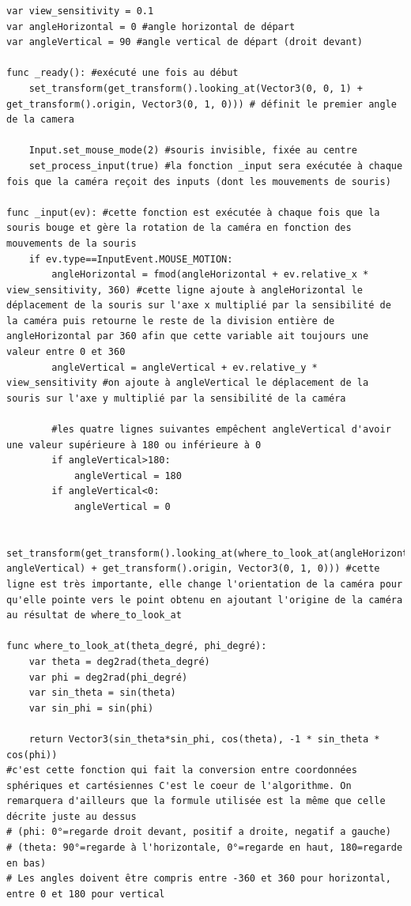 \renewcommand{\codeTitle}{Code de la caméra}
\begin{lstlisting}[caption=cameraControls.gd]
var view_sensitivity = 0.1
var angleHorizontal = 0 #angle horizontal de départ
var angleVertical = 90 #angle vertical de départ (droit devant)

func _ready(): #exécuté une fois au début
	set_transform(get_transform().looking_at(Vector3(0, 0, 1) + get_transform().origin, Vector3(0, 1, 0))) # définit le premier angle de la camera	
	
	Input.set_mouse_mode(2) #souris invisible, fixée au centre
	set_process_input(true) #la fonction _input sera exécutée à chaque fois que la caméra reçoit des inputs (dont les mouvements de souris)

func _input(ev): #cette fonction est exécutée à chaque fois que la souris bouge et gère la rotation de la caméra en fonction des mouvements de la souris
	if ev.type==InputEvent.MOUSE_MOTION:
		angleHorizontal = fmod(angleHorizontal + ev.relative_x * view_sensitivity, 360) #cette ligne ajoute à angleHorizontal le déplacement de la souris sur l'axe x multiplié par la sensibilité de la caméra puis retourne le reste de la division entière de angleHorizontal par 360 afin que cette variable ait toujours une valeur entre 0 et 360
		angleVertical = angleVertical + ev.relative_y * view_sensitivity #on ajoute à angleVertical le déplacement de la souris sur l'axe y multiplié par la sensibilité de la caméra
		
		#les quatre lignes suivantes empêchent angleVertical d'avoir une valeur supérieure à 180 ou inférieure à 0
		if angleVertical>180:
			angleVertical = 180
		if angleVertical<0:
			angleVertical = 0
		
		set_transform(get_transform().looking_at(where_to_look_at(angleHorizontal, angleVertical) + get_transform().origin, Vector3(0, 1, 0))) #cette ligne est très importante, elle change l'orientation de la caméra pour qu'elle pointe vers le point obtenu en ajoutant l'origine de la caméra au résultat de where_to_look_at

func where_to_look_at(theta_degré, phi_degré):
	var theta = deg2rad(theta_degré)
	var phi = deg2rad(phi_degré)
	var sin_theta = sin(theta)
	var sin_phi = sin(phi)
	
	return Vector3(sin_theta*sin_phi, cos(theta), -1 * sin_theta * cos(phi))
#c'est cette fonction qui fait la conversion entre coordonnées sphériques et cartésiennes C'est le coeur de l'algorithme. On remarquera d'ailleurs que la formule utilisée est la même que celle décrite juste au dessus
# (phi: 0°=regarde droit devant, positif a droite, negatif a gauche)
# (theta: 90°=regarde à l'horizontale, 0°=regarde en haut, 180=regarde en bas)
# Les angles doivent être compris entre -360 et 360 pour horizontal, entre 0 et 180 pour vertical
\end{lstlisting}


